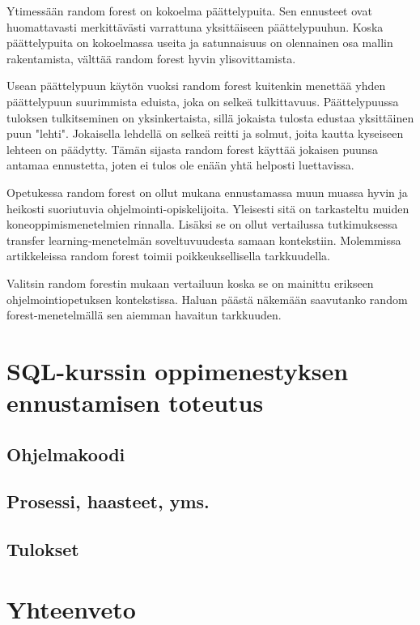 \documentclass[finnish,twoside,openright]{HYgraduMLDS}
\begin{document}
Ytimessään random forest on kokoelma päättelypuita. Sen ennusteet ovat huomattavasti merkittävästi varrattuna yksittäiseen päättelypuuhun\cite{james2013ISLR}. Koska päättelypuita on kokoelmassa useita ja satunnaisuus on olennainen osa mallin rakentamista, välttää random forest hyvin ylisovittamista\cite{james2013ISLR}. 

Usean päättelypuun käytön vuoksi random forest kuitenkin menettää yhden päättelypuun suurimmista eduista, joka on selkeä tulkittavuus\cite{james2013ISLR}. Päättelypuussa tuloksen tulkitseminen on yksinkertaista, sillä jokaista tulosta edustaa yksittäinen puun "lehti". Jokaisella lehdellä on selkeä reitti ja solmut, joita kautta kyseiseen lehteen on päädytty. Tämän sijasta random forest käyttää jokaisen puunsa antamaa ennustetta, joten ei tulos ole enään yhtä helposti luettavissa.

Opetukessa random forest on ollut mukana ennustamassa muun muassa hyvin ja heikosti suoriutuvia ohjelmointi-opiskelijoita. Yleisesti sitä on tarkasteltu muiden koneoppimismenetelmien rinnalla\cite{Ahadi:2015:EML:2787622.2787717}. Lisäksi se on ollut vertailussa tutkimuksessa transfer learning-menetelmän soveltuvuudesta samaan kontekstiin\cite{lagus2018transfer}. Molemmissa artikkeleissa random forest toimii poikkeuksellisella tarkkuudella.

Valitsin random forestin mukaan vertailuun koska se on mainittu erikseen ohjelmointiopetuksen kontekstissa. Haluan päästä näkemään saavutanko random forest-menetelmällä sen aiemman havaitun tarkkuuden.


\chapter{SQL-kurssin oppimenestyksen ennustamisen toteutus}

\section{Ohjelmakoodi}


\section{Prosessi, haasteet, yms.}


\section{Tulokset}


\chapter{Yhteenveto\label{chapter:Yhteenveto}}
\end{document}
